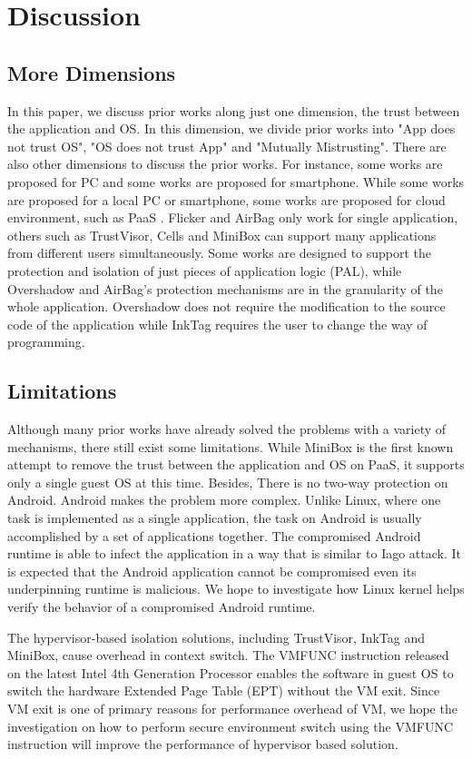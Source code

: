 \section{Discussion}
\label{sec:discussion}

\subsection{More Dimensions} 

In this paper, we discuss prior works along just one dimension, the trust
between the application and OS. In this dimension, we divide prior works into
"App does not trust OS", "OS does not trust App" and "Mutually Mistrusting".
There are also other dimensions to discuss the prior works. For instance, some
works \cite{Flicker, TrustVisor, Overshadow, InkTag, VirtualGhost,
CloudTerminal, SFI, PittSFIeld, NaCl, Krude, MiniBox} are proposed for PC and
some works \cite{TLR, VeriUI, TrustUI, TrustDroid, Cells, AirBag} are proposed
for smartphone. While some works are proposed for a local PC or smartphone, some
works are proposed for cloud environment, such as PaaS \cite{Krude, MiniBox}.
Flicker and AirBag only work for single application, others such as TrustVisor,
Cells and MiniBox can support many applications from different users
simultaneously. Some works are designed to support the protection and isolation
of just pieces of application logic (PAL), while Overshadow and AirBag's
protection mechanisms are in the granularity of the whole application.
Overshadow does not require the modification to the source code of the
application while InkTag requires the user to change the way of programming.

\subsection{Limitations}

Although many prior works have already solved the problems with a variety of
mechanisms, there still exist some limitations. While MiniBox \cite{MiniBox} is
the first known attempt to remove the trust between the application and OS on
PaaS, it supports only a single guest OS at this time. Besides, There is no two-way
protection on Android. Android makes the problem more complex. Unlike Linux,
where one task is implemented as a single application, the task on Android is
usually accomplished by a set of applications together. The compromised Android
runtime is able to infect the application in a way that is similar to Iago
attack. It is expected that the Android application cannot be compromised even
its underpinning runtime is malicious. We hope to investigate how Linux kernel
helps verify the behavior of a compromised Android runtime. 

The hypervisor-based isolation solutions, including TrustVisor, InkTag and
MiniBox, cause overhead in context switch. The VMFUNC instruction released on
the latest Intel 4th Generation Processor enables the software in guest OS to
switch the hardware Extended Page Table (EPT) without the VM exit. Since VM
exit is one of primary reasons for performance overhead of VM, we hope the investigation on
how to perform secure environment switch using the VMFUNC instruction will
improve the performance of hypervisor based solution.
